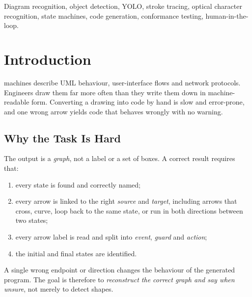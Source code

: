 \documentclass[journal,10pt]{IEEEtran}
\begin{document}
\begin{IEEEkeywords}
Diagram recognition, object detection, YOLO, stroke tracing, optical character
recognition, state machines, code generation, conformance testing, human-in-the-loop.
\end{IEEEkeywords}

\section{Introduction}
 machines describe UML behaviour, user-interface flows and network
protocols. Engineers draw them far more often than they write them down in
machine-readable form. Converting a drawing into code by hand is slow and error-prone,
and one wrong arrow yields code that behaves wrongly with no warning.

\subsection{Why the Task Is Hard}
The output is a \emph{graph}, not a label or a set of boxes. A correct result requires
that:
\begin{enumerate}
\item every state is found and correctly named;
\item every arrow is linked to the right \emph{source} and \emph{target}, including
arrows that cross, curve, loop back to the same state, or run in both directions between
two states;
\item every arrow label is read and split into \emph{event}, \emph{guard} and
\emph{action};
\item the initial and final states are identified.
\end{enumerate}
A single wrong endpoint or direction changes the behaviour of the generated program. The
goal is therefore to \emph{reconstruct the correct graph and say when unsure}, not merely
to detect shapes.
\end{document}
